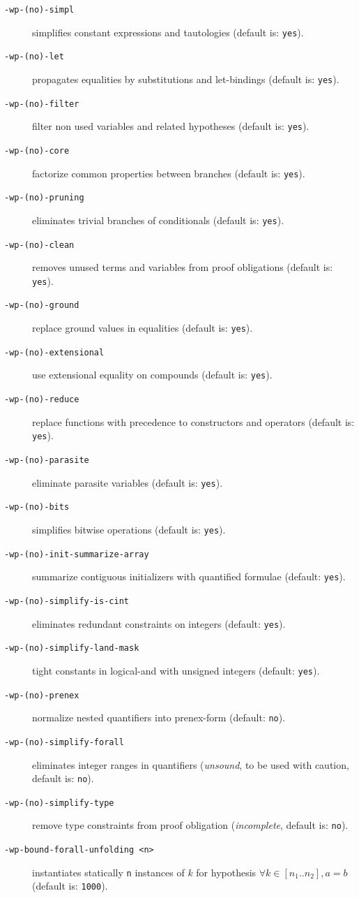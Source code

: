 \begin{description}
\item[\tt -wp-(no)-simpl] simplifies constant
  expressions and tautologies (default is: \texttt{yes}).
\item[\tt -wp-(no)-let] propagates equalities by substitutions
  and let-bindings (default is: \texttt{yes}).
\item[\tt -wp-(no)-filter] filter non used variables and related hypotheses
  (default is: \texttt{yes}).
\item[\tt -wp-(no)-core] factorize common properties between branches
  (default is: \texttt{yes}).
\item[\tt -wp-(no)-pruning] eliminates trivial branches of conditionals
  (default is: \texttt{yes}).
\item[\tt -wp-(no)-clean] removes unused terms and variables from
  proof obligations (default is: \texttt{yes}).
\item[\tt -wp-(no)-ground] replace ground values in equalities
  (default is: \texttt{yes}).
\item[\tt -wp-(no)-extensional] use extensional equality on compounds
  (default is: \texttt{yes}).
\item[\tt -wp-(no)-reduce] replace functions with precedence to constructors and
  operators (default is: \texttt{yes}).
\item[\tt -wp-(no)-parasite] eliminate parasite variables
  (default is: \texttt{yes}).
\item[\tt -wp-(no)-bits] simplifies bitwise operations
  (default is: \texttt{yes}).
\item[\tt -wp-(no)-init-summarize-array] summarize contiguous initializers
  with quantified formulae (default: \texttt{yes}).
\item[\tt -wp-(no)-simplify-is-cint] eliminates redundant constraints on integers
  (default: \texttt{yes}).
\item[\tt -wp-(no)-simplify-land-mask] tight constants in logical-and with
  unsigned integers (default: \texttt{yes}).
\item[\tt -wp-(no)-prenex] normalize nested quantifiers into prenex-form
  (default: \texttt{no}).
\item[\tt -wp-(no)-simplify-forall] eliminates integer ranges in quantifiers
  (\emph{unsound}, to be used with caution, default is: \texttt{no}).
\item[\tt -wp-(no)-simplify-type] remove type constraints from proof obligation
  (\emph{incomplete}, default is: \texttt{no}).
\item[\tt -wp-bound-forall-unfolding <n>] instantiates statically \texttt{n}
  instances of $k$ for hypothesis $\forall k \in [n_1..n_2], a = b$
  (default is: \texttt{1000}).
\end{description}


